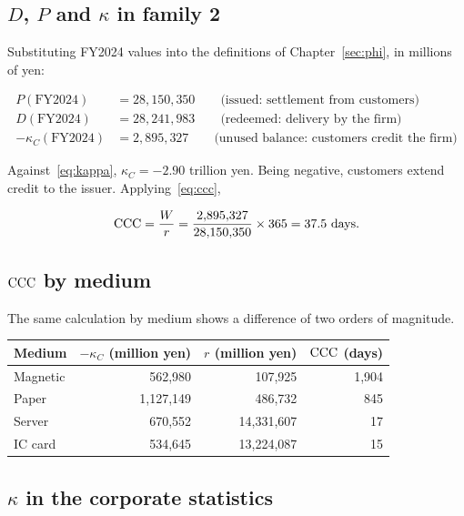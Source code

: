 \subsection{\texorpdfstring{$D$}{D}, \texorpdfstring{$P$}{P} and \texorpdfstring{$\kappa$}{kappa} in family 2}

Substituting FY2024 values into the definitions of Chapter~\ref{sec:phi}, in millions of yen:

\begin{align}
P(\text{FY2024}) &= 28{,}150{,}350 \qquad \text{(issued: settlement from customers)} \\
D(\text{FY2024}) &= 28{,}241{,}983 \qquad \text{(redeemed: delivery by the firm)} \\
-\kappa_C(\text{FY2024}) &= 2{,}895{,}327 \qquad \text{(unused balance: customers credit the firm)}
\end{align}

Against~\eqref{eq:kappa}, $\kappa_C = -2.90$ trillion yen. Being negative, customers extend
credit to the issuer. Applying~\eqref{eq:ccc},

\[
\CCC = \frac{W}{r} = \frac{2{,}895{,}327}{28{,}150{,}350}\times 365 = 37.5\ \text{days}.
\]

\subsection{\texorpdfstring{$\mathrm{CCC}$}{CCC} by medium}

The same calculation by medium shows a difference of two orders of magnitude.

\begin{center}
\begin{tabular}{@{}lrrr@{}}
\toprule
Medium & $-\kappa_C$ (million yen) & $r$ (million yen) & $\mathrm{CCC}$ (days) \\
\midrule
Magnetic & 562{,}980 & 107{,}925 & 1{,}904 \\
Paper & 1{,}127{,}149 & 486{,}732 & 845 \\
Server & 670{,}552 & 14{,}331{,}607 & 17 \\
IC card & 534{,}645 & 13{,}224{,}087 & 15 \\
\bottomrule
\end{tabular}
\label{tab:media-ccc}
\end{center}

\subsection{\texorpdfstring{$\kappa$}{kappa} in the corporate statistics}

